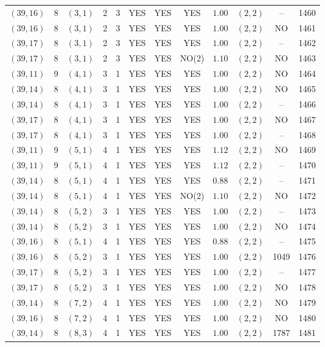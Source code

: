 \begin{longtable}{|c|c|c|c|c|c|c|c|c|c|c|c|}
$(39,16)$ & 8 & $(3,1)$ & 2 & 3 & YES & YES & YES & $1.00$ & $(2,2)$ & -- & 1460\\
$(39,16)$ & 8 & $(3,1)$ & 2 & 3 & YES & YES & YES & $1.00$ & $(2,2)$ & NO & 1461\\
$(39,17)$ & 8 & $(3,1)$ & 2 & 3 & YES & YES & YES & $1.00$ & $(2,2)$ & -- & 1462\\
$(39,17)$ & 8 & $(3,1)$ & 2 & 3 & YES & YES & NO(2) & $1.10$ & $(2,2)$ & NO & 1463\\
$(39,11)$ & 9 & $(4,1)$ & 3 & 1 & YES & YES & YES & $1.00$ & $(2,2)$ & NO & 1464\\
$(39,14)$ & 8 & $(4,1)$ & 3 & 1 & YES & YES & YES & $1.00$ & $(2,2)$ & NO & 1465\\
$(39,14)$ & 8 & $(4,1)$ & 3 & 1 & YES & YES & YES & $1.00$ & $(2,2)$ & -- & 1466\\
$(39,17)$ & 8 & $(4,1)$ & 3 & 1 & YES & YES & YES & $1.00$ & $(2,2)$ & NO & 1467\\
$(39,17)$ & 8 & $(4,1)$ & 3 & 1 & YES & YES & YES & $1.00$ & $(2,2)$ & -- & 1468\\
$(39,11)$ & 9 & $(5,1)$ & 4 & 1 & YES & YES & YES & $1.12$ & $(2,2)$ & NO & 1469\\
$(39,11)$ & 9 & $(5,1)$ & 4 & 1 & YES & YES & YES & $1.12$ & $(2,2)$ & -- & 1470\\
$(39,14)$ & 8 & $(5,1)$ & 4 & 1 & YES & YES & YES & $0.88$ & $(2,2)$ & -- & 1471\\
$(39,14)$ & 8 & $(5,1)$ & 4 & 1 & YES & YES & NO(2) & $1.10$ & $(2,2)$ & NO & 1472\\
$(39,14)$ & 8 & $(5,2)$ & 3 & 1 & YES & YES & YES & $1.00$ & $(2,2)$ & -- & 1473\\
$(39,14)$ & 8 & $(5,2)$ & 3 & 1 & YES & YES & YES & $1.00$ & $(2,2)$ & NO & 1474\\
$(39,16)$ & 8 & $(5,1)$ & 4 & 1 & YES & YES & YES & $0.88$ & $(2,2)$ & -- & 1475\\
$(39,16)$ & 8 & $(5,2)$ & 3 & 1 & YES & YES & YES & $1.00$ & $(2,2)$ & 1049 & 1476\\
$(39,17)$ & 8 & $(5,2)$ & 3 & 1 & YES & YES & YES & $1.00$ & $(2,2)$ & -- & 1477\\
$(39,17)$ & 8 & $(5,2)$ & 3 & 1 & YES & YES & YES & $1.00$ & $(2,2)$ & NO & 1478\\
$(39,14)$ & 8 & $(7,2)$ & 4 & 1 & YES & YES & YES & $1.00$ & $(2,2)$ & NO & 1479\\
$(39,16)$ & 8 & $(7,2)$ & 4 & 1 & YES & YES & YES & $1.00$ & $(2,2)$ & NO & 1480\\
$(39,14)$ & 8 & $(8,3)$ & 4 & 1 & YES & YES & YES & $1.00$ & $(2,2)$ & 1787 & 1481\\

\end{longtable}
